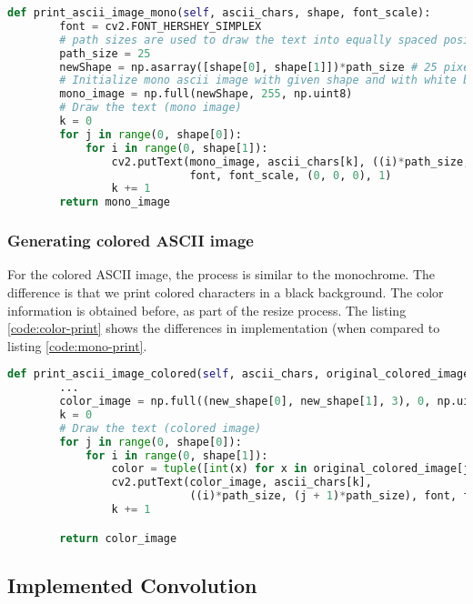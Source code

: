 \documentclass[]{IEEEtran}
\begin{document}
 \begin{lstlisting}[language=Python, caption={Monochrome ASCII image generator}, label={code:mono-print}]
    def print_ascii_image_mono(self, ascii_chars, shape, font_scale):
        font = cv2.FONT_HERSHEY_SIMPLEX
        # path sizes are used to draw the text into equally spaced positions in image
        path_size = 25
        newShape = np.asarray([shape[0], shape[1]])*path_size # 25 pixel for each char
        # Initialize mono ascii image with given shape and with white background
        mono_image = np.full(newShape, 255, np.uint8)
        # Draw the text (mono image)
        k = 0
        for j in range(0, shape[0]):
            for i in range(0, shape[1]):
                cv2.putText(mono_image, ascii_chars[k], ((i)*path_size, (j + 1)*path_size),
                            font, font_scale, (0, 0, 0), 1)
                k += 1
        return mono_image
\end{lstlisting}

\subsubsection{Generating colored ASCII image}
For the colored ASCII image, the process is similar to the monochrome. The difference is that we print colored characters in a black background. The color information is obtained before, as part of the resize process. The listing \ref{code:color-print} shows the differences in implementation (when compared to listing \ref{code:mono-print}.

 \begin{lstlisting}[language=Python, caption={Colored ASCII image generator}, label={code:color-print}]
    def print_ascii_image_colored(self, ascii_chars, original_colored_image, shape, font_scale):
        ...
        color_image = np.full((new_shape[0], new_shape[1], 3), 0, np.uint8)
        k = 0
        # Draw the text (colored image)
        for j in range(0, shape[0]):
            for i in range(0, shape[1]):
                color = tuple([int(x) for x in original_colored_image[j][i]])
                cv2.putText(color_image, ascii_chars[k],
                            ((i)*path_size, (j + 1)*path_size), font, font_scale, color, 1)
                k += 1

        return color_image
\end{lstlisting}


\subsection{Implemented Convolution}
\end{document}
